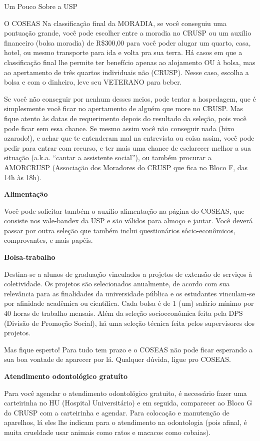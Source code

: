 \begin{secao}{Um Pouco Sobre a USP}
\begin{subsecao}{O COSEAS}
Na classificação final da MORADIA, se você conseguiu uma pontuação grande, você
pode escolher entre a moradia no CRUSP ou um auxílio financeiro (bolsa moradia)
de R\$300,00 para você poder alugar um quarto, casa, hotel, ou mesmo transporte
para ida e volta pra sua terra.  Há casos em que a classificação final lhe
permite ter benefício apenas ao alojamento OU à bolsa, mas ao apertamento de
três quartos individuais não (CRUSP). Nesse caso, escolha a bolsa e com o
dinheiro, leve seu VETERANO para beber.

Se você não conseguir por nenhum desses meios, pode tentar a hospedagem, que é
simplesmente você ficar no apertamento de alguém que more no CRUSP. Mas fique
atento às datas de requerimento depois do resultado da seleção, pois você pode
ficar sem essa chance. Se mesmo assim você não conseguir nada (bixo azarado!),
e achar que te entenderam mal na entrevista ou coisa assim, você pode pedir para
entrar com recurso, e ter mais uma chance de esclarecer melhor a sua situação
(a.k.a. “cantar a assistente social”), ou também procurar a
AMORCRUSP (Associação dos Moradores do CRUSP que fica no Bloco F, das 14h às 18h).

{\bf Alimentação}

Você pode solicitar também o auxílio alimentação na página do COSEAS, que
consiste nos vale-bandex da USP e são válidos para almoço e jantar. Você deverá
passar por outra seleção que também inclui questionários sócio-econômicos,
comprovantes, e mais papéis.

{\bf Bolsa-trabalho}

Destina-se a alunos de graduação vinculados a projetos de extensão de serviços à
coletividade. Os projetos são selecionados anualmente, de acordo com sua relevância
para as finalidades da universidade pública e os estudantes vinculam-se por
afinidade acadêmica ou científica. Cada bolsa é de 1 (um) salário mínimo por
40 horas de trabalho mensais. Além da seleção socioeconômica feita pela
DPS (Divisão de Promoção Social), há uma seleção técnica feita pelos supervisores
dos projetos.

Mas fique esperto! Para tudo tem prazo e o COSEAS não pode ficar esperando a sua
boa vontade de aparecer por lá. Qualquer dúvida, ligue pro COSEAS.

{\bf Atendimento odontológico gratuíto}

Para você agendar o atendimento odontológico gratuito, é necessário fazer uma
carteirinha no HU (Hospital Universitário) e em seguida, comparecer ao Bloco G
do CRUSP com a carteirinha e agendar. Para colocação e manutenção de aparelhos,
lá eles lhe indicam para o atendimento na odontologia (pois afinal, é muita
crueldade usar animais como ratos e macacos como cobaias). 


\end{subsecao}
\end{secao}
